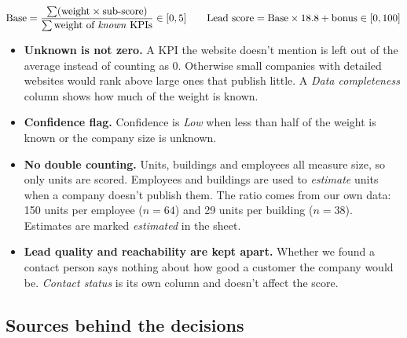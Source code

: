 \documentclass[11pt,a4paper]{article}
\begin{document}
\[
\text{Base} = \frac{\sum (\text{weight} \times \text{sub-score})}{\sum \text{weight of
\emph{known} KPIs}} \in [0,5]
\qquad
\text{Lead score} = \text{Base} \times 18.8 + \text{bonus} \in [0,100]
\]

\begin{itemize}
  \item \textbf{Unknown is not zero.} A KPI the website doesn't mention is left out of the
        average instead of counting as 0. Otherwise small companies with detailed websites would
        rank above large ones that publish little. A \emph{Data completeness} column shows how
        much of the weight is known.
  \item \textbf{Confidence flag.} Confidence is \emph{Low} when less than half of the weight is
        known or the company size is unknown.
  \item \textbf{No double counting.} Units, buildings and employees all measure size, so only
        units are scored. Employees and buildings are used to \emph{estimate} units when a company
        doesn't publish them. The ratio comes from our own data: 150 units per employee
        ($n=64$) and 29 units per building ($n=38$). Estimates are marked \emph{estimated} in
        the sheet.
  \item \textbf{Lead quality and reachability are kept apart.} Whether we found a contact person
        says nothing about how good a customer the company would be. \emph{Contact status} is
        its own column and doesn't affect the score.
\end{itemize}

\subsection{Sources behind the decisions}
\end{document}
